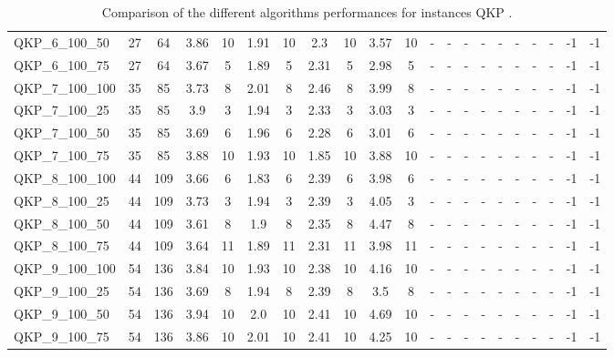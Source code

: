 \begin{sidewaystable}[!ht]
{\begin{tabular}{lcccccccccccccccccccc}
QKP\_6\_100\_50 & 27 & 64 & 3.86 & 10 &  \textcolor{blue2}{1.91} & 10 & 2.3 & 10 & 3.57 & 10 &  - &  - &  - &  - &  - &  - &  - &  - & -1 & -1 \\
QKP\_6\_100\_75 & 27 & 64 & 3.67 & 5 &  \textcolor{blue2}{1.89} & 5 & 2.31 & 5 & 2.98 & 5 &  - &  - &  - &  - &  - &  - &  - &  - & -1 & -1 \\
QKP\_7\_100\_100 & 35 & 85 & 3.73 & 8 &  \textcolor{blue2}{2.01} & 8 & 2.46 & 8 & 3.99 & 8 &  - &  - &  - &  - &  - &  - &  - &  - & -1 & -1 \\
QKP\_7\_100\_25 & 35 & 85 & 3.9 & 3 &  \textcolor{blue2}{1.94} & 3 & 2.33 & 3 & 3.03 & 3 &  - &  - &  - &  - &  - &  - &  - &  - & -1 & -1 \\
QKP\_7\_100\_50 & 35 & 85 & 3.69 & 6 &  \textcolor{blue2}{1.96} & 6 & 2.28 & 6 & 3.01 & 6 &  - &  - &  - &  - &  - &  - &  - &  - & -1 & -1 \\
QKP\_7\_100\_75 & 35 & 85 & 3.88 & 10 & 1.93 & 10 &  \textcolor{blue2}{1.85} & 10 & 3.88 & 10 &  - &  - &  - &  - &  - &  - &  - &  - & -1 & -1 \\
QKP\_8\_100\_100 & 44 & 109 & 3.66 & 6 &  \textcolor{blue2}{1.83} & 6 & 2.39 & 6 & 3.98 & 6 &  - &  - &  - &  - &  - &  - &  - &  - & -1 & -1 \\
QKP\_8\_100\_25 & 44 & 109 & 3.73 & 3 &  \textcolor{blue2}{1.94} & 3 & 2.39 & 3 & 4.05 & 3 &  - &  - &  - &  - &  - &  - &  - &  - & -1 & -1 \\
QKP\_8\_100\_50 & 44 & 109 & 3.61 & 8 &  \textcolor{blue2}{1.9} & 8 & 2.35 & 8 & 4.47 & 8 &  - &  - &  - &  - &  - &  - &  - &  - & -1 & -1 \\
QKP\_8\_100\_75 & 44 & 109 & 3.64 & 11 &  \textcolor{blue2}{1.89} & 11 & 2.31 & 11 & 3.98 & 11 &  - &  - &  - &  - &  - &  - &  - &  - & -1 & -1 \\
QKP\_9\_100\_100 & 54 & 136 & 3.84 & 10 &  \textcolor{blue2}{1.93} & 10 & 2.38 & 10 & 4.16 & 10 &  - &  - &  - &  - &  - &  - &  - &  - & -1 & -1 \\
QKP\_9\_100\_25 & 54 & 136 & 3.69 & 8 &  \textcolor{blue2}{1.94} & 8 & 2.39 & 8 & 3.5 & 8 &  - &  - &  - &  - &  - &  - &  - &  - & -1 & -1 \\
QKP\_9\_100\_50 & 54 & 136 & 3.94 & 10 &  \textcolor{blue2}{2.0} & 10 & 2.41 & 10 & 4.69 & 10 &  - &  - &  - &  - &  - &  - &  - &  - & -1 & -1 \\
QKP\_9\_100\_75 & 54 & 136 & 3.86 & 10 &  \textcolor{blue2}{2.01} & 10 & 2.41 & 10 & 4.25 & 10 &  - &  - &  - &  - &  - &  - &  - &  - & -1 & -1 \\
\bottomrule
\end{tabular}
}%
\caption{Comparison of the different algorithms performances for instances QKP .}
\label{tab:table_compare_QKP }
\end{sidewaystable}

